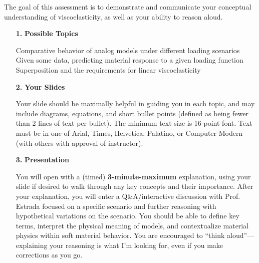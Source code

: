 \documentclass[preprint,12pt,authoryear]{elsarticle}
\begin{document}
The goal of this assessment is to demonstrate and communicate your conceptual understanding of viscoelasticity, as well as your ability to reason aloud. 

\begin{itemize}
\item[\textbf{1. }]\textbf{Possible Topics} 
\begin{outline} 
\1 Comparative behavior of analog models under different loading scenarios 
\1 Given some data, predicting material response to a given loading function 
\1 Superposition and the requirements for linear viscoelasticity 
\end{outline}
\item[\textbf{2. }]\textbf{Your Slides} 
\begin{outline} 
\1 Your slide should be maximally helpful in guiding you in each topic, and may include diagrams, equations, and short bullet points (defined as being fewer than 2 lines of text per bullet). 
\1 The minimum text size is 16-point font. 
\1 Text must be in one of Arial, Times, Helvetica, Palatino, or Computer Modern (with others with approval of instructor).
\end{outline}
\item[\textbf{3. }]\textbf{Presentation} 
\begin{outline}
\1 You will open with a (timed) \textbf{3-minute-maximum} explanation, using your slide if desired to walk through any key concepts and their importance. 
\1 After your explanation, you will enter a Q\&A/interactive discussion with Prof. Estrada focused on a specific scenario and further reasoning with hypothetical variations on the scenario. 
\1 You should be able to define key terms, interpret the physical meaning of models, and contextualize material physics within soft material behavior. 
\1 You are encouraged to “think aloud”—explaining your reasoning is what I'm looking for, even if you make corrections as you go. 
\end{outline}
\end{itemize}



\newpage



%


% 
% 
% 

%
%
%

\appendix
\end{document}
